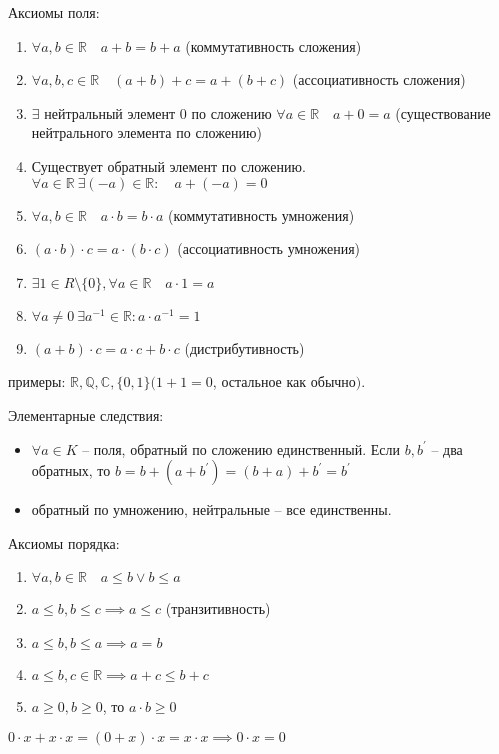 \documentclass{book}
\newcommand\R{\ensuremath{\mathbb{R}}}
\newcommand\Q{\ensuremath{\mathbb{Q}}}
\renewcommand\C{\ensuremath{\mathbb{C}}}
\newcommand{\p}[1]{#1^{\prime}}
\theoremstyle{definition}
\begin{document}
        Аксиомы поля:
        \begin{enumerate}
            \item $\forall a, b\in \R\quad a+b=b+a$ (коммутативность сложения)
            \item $\forall a, b, c\in \R\quad (a+b)+c = a+(b+c)$ (ассоциативность сложения)
            \item $\exists $ нейтральный элемент $0$ по сложению $\forall a\in \R\quad a+0=a$ (существование нейтрального элемента по сложению)
            \item Существует обратный элемент по сложению.\\
            $\forall a\in \R\ \exists (-a)\in \R: \quad a+(-a) = 0$
            \item $\forall a, b\in \R\quad a\cdot b = b\cdot a$ (коммутативность умножения)
            \item $(a\cdot b)\cdot c = a\cdot (b\cdot c)$ (ассоциативность умножения)
            \item $\exists 1\in R\setminus \{0\}, \forall a\in \R\quad a\cdot 1 = a$
            \item $\forall a\neq 0\ \exists  a^{-1}\in \R: a\cdot a^{-1} = 1$
            \item $(a+b)\cdot c = a\cdot c + b\cdot c$ (дистрибутивность)
        \end{enumerate}
        примеры: $\R, \Q, \C, \{0,1\} (1+1=0$,  остальное как обычно$)$.

        Элементарные следствия:
        \begin{itemize}
            \item $\forall a\in K$ -- поля, обратный по сложению единственный. Если $b, \p b$ -- два обратных, то $b= b+(a+\p b)=(b+a)+\p b = \p b$
            \item обратный по умножению, нейтральные -- все единственны.
        \end{itemize}
        Аксиомы порядка:
        \begin{enumerate}
            \item $\forall a, b\in \R\quad a\leqslant b \vee b\leqslant a$
            \item $a\leqslant b, b\leqslant c \implies a\leqslant c$ (транзитивность)
            \item $a\leqslant b, b\leqslant a \implies a=b$ 
            \item $a\leqslant b, c\in \R\implies a+c\leqslant b+c$
            \item $a\geqslant 0, b\geqslant 0$, то $a\cdot b\geqslant 0$
        \end{enumerate}
        $0\cdot x + x\cdot x = (0+x)\cdot x = x\cdot x \implies  0\cdot x = 0$
\end{document}
